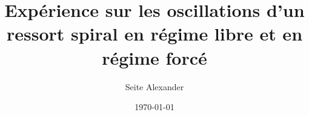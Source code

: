 \documentclass[letterpaper,12pt]{article}
\begin{document}
\title{Expérience sur les oscillations d'un ressort spiral en régime libre et en régime forcé}
\author{Seite Alexander}
\date{\today}
\maketitle
\newline

\tableofcontents

\newpage

%


%




%




%



%


%




%

\end{document}
